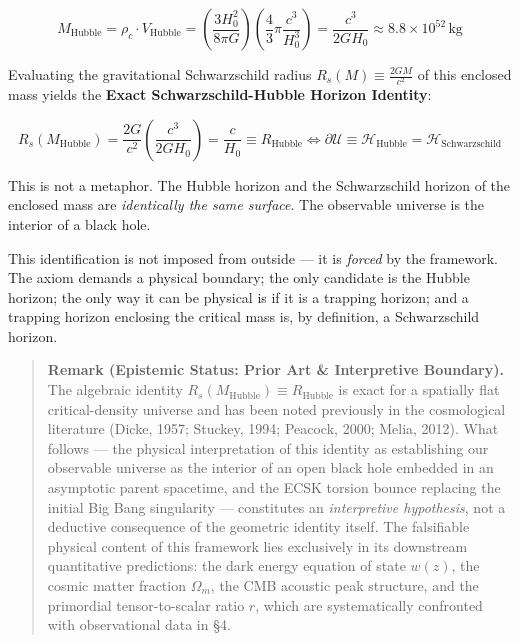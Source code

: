 \documentclass[11pt,a4paper]{article}
\theoremstyle{definition}\newtheorem{definition}{Definition}
\theoremstyle{remark}\newtheorem{remark}{Remark}
\begin{document}
\begin{equation}
M_{\text{Hubble}} = \rho_c \cdot V_{\text{Hubble}} = \left( \frac{3 H_0^2}{8\pi G} \right) \left( \frac{4}{3}\pi \frac{c^3}{H_0^3} \right) = \frac{c^3}{2 G H_0} \approx 8.8 \times 10^{52} \, \mathrm{kg}
\end{equation}


Evaluating the gravitational Schwarzschild radius $R_s(M) \equiv \frac{2 G M}{c^2}$ of this enclosed mass yields the \textbf{Exact Schwarzschild-Hubble Horizon Identity}:


\begin{equation}
\boxed{R_s(M_{\text{Hubble}}) = \frac{2 G}{c^2} \left( \frac{c^3}{2 G H_0} \right) = \frac{c}{H_0} \equiv R_{\text{Hubble}} \iff \partial \mathcal{U} \equiv \mathcal{H}_{\text{Hubble}} = \mathcal{H}_{\text{Schwarzschild}}}
\end{equation}


This is not a metaphor. The Hubble horizon and the Schwarzschild horizon of the enclosed mass are \textit{identically the same surface}. The observable universe is the interior of a black hole.

This identification is not imposed from outside — it is \textit{forced} by the framework. The axiom demands a physical boundary; the only candidate is the Hubble horizon; the only way it can be physical is if it is a trapping horizon; and a trapping horizon enclosing the critical mass is, by definition, a Schwarzschild horizon.

\begin{quote}\textbf{Remark (Epistemic Status: Prior Art \& Interpretive Boundary).} The algebraic identity $R_s(M_{\text{Hubble}}) \equiv R_{\text{Hubble}}$ is exact for a spatially flat critical-density universe and has been noted previously in the cosmological literature (Dicke, 1957; Stuckey, 1994; Peacock, 2000; Melia, 2012). What follows — the physical interpretation of this identity as establishing our observable universe as the interior of an open black hole embedded in an asymptotic parent spacetime, and the ECSK torsion bounce replacing the initial Big Bang singularity — constitutes an \textit{interpretive hypothesis}, not a deductive consequence of the geometric identity itself. The falsifiable physical content of this framework lies exclusively in its downstream quantitative predictions: the dark energy equation of state $w(z)$, the cosmic matter fraction $\Omega_m$, the CMB acoustic peak structure, and the primordial tensor-to-scalar ratio $r$, which are systematically confronted with observational data in §4.\end{quote}
\end{document}
